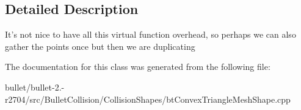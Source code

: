 \subsection{Detailed Description}
It's not nice to have all this virtual function overhead, so perhaps we can also gather the points once but then we are duplicating 

The documentation for this class was generated from the following file\+:\begin{DoxyCompactItemize}
\item 
bullet/bullet-\/2.-\/r2704/src/\+Bullet\+Collision/\+Collision\+Shapes/bt\+Convex\+Triangle\+Mesh\+Shape.\+cpp\end{DoxyCompactItemize}

